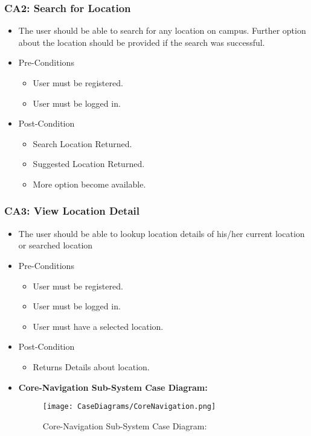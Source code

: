 \documentclass[12pt,a4paper]{article}
\begin{document}
		\subsubsection{CA2: Search for Location}
			\begin{itemize}
				\item The user should be able to search for any location on campus. Further option about the location should be provided if the search was successful.
				\item Pre-Conditions
					\begin{itemize}
						\item User must be registered.
						\item User must be logged in.
					\end{itemize}
				\item Post-Condition
					\begin{itemize}
						\item Search Location Returned.
						\item Suggested Location Returned.
						\item More option become available.
					\end{itemize}
			\end{itemize}
		\subsubsection{CA3: View Location Detail}
			\begin{itemize}
				\item The user should be able to lookup location details of his/her current location or searched location
				\item Pre-Conditions
					\begin{itemize}
						\item User must be registered.
						\item User must be logged in.
						\item User must have a selected location.
					\end{itemize}
				\item Post-Condition
					\begin{itemize}
						\item Returns Details about location.
					\end{itemize}
				\item \textbf{Core-Navigation Sub-System Case Diagram:}
					\begin{figure}[H]
						\texttt{[image: CaseDiagrams/CoreNavigation.png]}
						\caption{Core-Navigation Sub-System Case Diagram:}
					\end{figure}
			\end{itemize}
\end{document}
